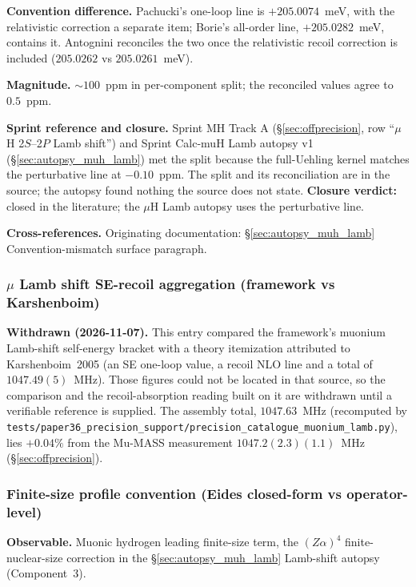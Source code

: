 \documentclass[11pt]{article}
\begin{document}
\textbf{Convention difference.}  Pachucki's one-loop line is
$+205.0074$~meV, with the relativistic correction a separate item;
Borie's all-order line, $+205.0282$~meV, contains it.  Antognini
reconciles the two once the relativistic recoil correction is included
($205.0262$ vs $205.0261$~meV).

\textbf{Magnitude.}  $\sim 100$~ppm in per-component split; the
reconciled values agree to $0.5$~ppm.

\textbf{Sprint reference and closure.}  Sprint MH Track A
(\S\ref{sec:offprecision}, row ``$\mu$H 2$S$--2$P$ Lamb shift'') and
Sprint Calc-muH Lamb autopsy v1 (\S\ref{sec:autopsy_muh_lamb}) met the
split because the full-Uehling kernel matches the perturbative line at
$-0.10$~ppm.  The split and its reconciliation are in the source; the
autopsy found nothing the source does not state.
\textbf{Closure verdict:} closed in the literature; the $\mu$H Lamb
autopsy uses the perturbative line.

\textbf{Cross-references.}  Originating documentation:
\S\ref{sec:autopsy_muh_lamb} Convention-mismatch surface paragraph.

\subsubsection{$\mu$ Lamb shift SE-recoil aggregation (framework vs Karshenboim)}
\label{sec:conv_karshenboim_recoil}

\textbf{Withdrawn (2026-11-07).}  This entry compared the framework's
muonium Lamb-shift self-energy bracket with a theory itemization
attributed to Karshenboim~2005 (an SE one-loop value, a recoil NLO line
and a total of $1047.49(5)$~MHz).  Those figures could not be located in
that source, so the comparison and the recoil-absorption reading built
on it are withdrawn until a verifiable reference is supplied.
The assembly total, $1047.63$~MHz (recomputed by
\texttt{tests/paper36\_precision\_support/precision\_catalogue\_muonium\_lamb.py}),
lies $+0.04\%$ from the Mu-MASS measurement $1047.2(2.3)(1.1)$~MHz
(\S\ref{sec:offprecision}).

\subsubsection{Finite-size profile convention (Eides closed-form vs operator-level)}
\label{sec:conv_friar_profile}

\textbf{Observable.}  Muonic hydrogen leading finite-size term, the
$(Z\alpha)^4$ finite-nuclear-size correction in the
\S\ref{sec:autopsy_muh_lamb} Lamb-shift autopsy (Component~3).
\end{document}
